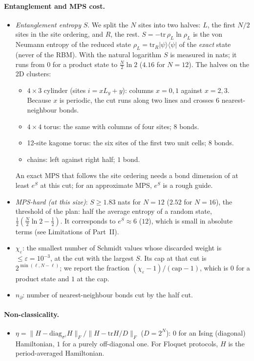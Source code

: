 \documentclass[11pt,a4paper]{article}
\begin{document}
\paragraph{Entanglement and MPS cost.}
\begin{itemize}
  \item \emph{Entanglement entropy} $S$. We split the $N$ sites into two halves: $L$, the first $N/2$ sites in the
    site ordering, and $R$, the rest. $S=-\mathrm{tr}\,\rho_L\ln\rho_L$ is the von Neumann entropy of the reduced
    state $\rho_L=\mathrm{tr}_R|\psi\rangle\langle\psi|$ of the \emph{exact} state (never of the RBM). With the
    natural logarithm $S$ is measured in nats; it runs from $0$ for a product state to $\frac N2\ln2$ ($4.16$ for
    $N=12$). The halves on the 2D clusters:
    \begin{itemize}
      \item $4\times3$ cylinder (sites $i=xL_y+y$): columns $x=0,1$ against $x=2,3$. Because $x$ is periodic, the
        cut runs along two lines and crosses $6$ nearest-neighbour bonds.
      \item $4\times4$ torus: the same with columns of four sites; $8$ bonds.
      \item 12-site kagome torus: the six sites of the first two unit cells; $8$ bonds.
      \item chains: left against right half; $1$ bond.
    \end{itemize}
    An exact MPS that follows the site ordering needs a bond dimension of at least $e^S$ at this cut; for an
    approximate MPS, $e^S$ is a rough guide.
  \item \emph{MPS-hard (at this size)}: $S\ge1.83$ nats for $N=12$ ($2.52$ for $N=16$), the threshold of the plan:
    half the average entropy of a random state, $\frac12(\frac N2\ln2-\frac12)$. It corresponds to $e^S\approx6$
    ($12$), which is small in absolute terms (see Limitations of Part~II).
  \item $\chi_\varepsilon$: the smallest number of Schmidt values whose discarded weight is $\le\varepsilon=10^{-3}$, at
    the cut with the largest $S$. Its cap at that cut is $2^{\min(\ell,N-\ell)}$; we report the fraction
    $(\chi_\varepsilon-1)/(\mathrm{cap}-1)$, which is $0$ for a product state and $1$ at the cap.
  \item $n_\partial$: number of nearest-neighbour bonds cut by the half cut.
\end{itemize}

\paragraph{Non-classicality.}
\begin{itemize}
  \item $\eta=\|H-\mathrm{diag}_{\sigma^z}H\|_F/\|H-\mathrm{tr}H/D\|_F$ ($D=2^N$): $0$ for an Ising (diagonal)
    Hamiltonian, $1$ for a purely off-diagonal one. For Floquet protocols, $H$ is the period-averaged Hamiltonian.
\end{itemize}
\end{document}
